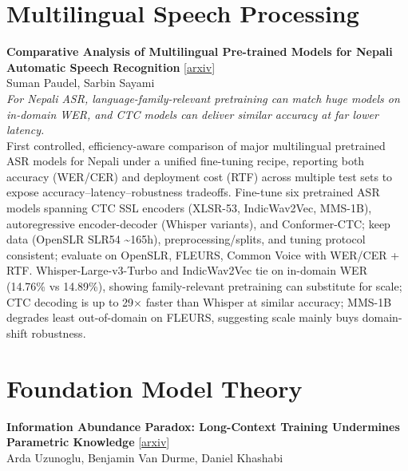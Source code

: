\documentclass[12pt,letterpaper]{article}
\begin{document}
\medskip


\section*{Multilingual Speech Processing}

{\small\textbf{Comparative Analysis of Multilingual Pre-trained Models for Nepali Automatic Speech Recognition}} {\scriptsize[\href{https://arxiv.org/abs/2608.12327}{arxiv}]}\\
{\scriptsize Suman Paudel, Sarbin Sayami}\\

{\small\textit{For Nepali ASR, language-family-relevant pretraining can match huge models on in-domain WER, and CTC models can deliver similar accuracy at far lower latency.}}\\[1pt]
{\footnotesize First controlled, efficiency-aware comparison of major multilingual pretrained ASR models for Nepali under a unified fine-tuning recipe, reporting both accuracy (WER/CER) and deployment cost (RTF) across multiple test sets to expose accuracy--latency--robustness tradeoffs. Fine-tune six pretrained ASR models spanning CTC SSL encoders (XLSR-53, IndicWav2Vec, MMS-1B), autoregressive encoder-decoder (Whisper variants), and Conformer-CTC; keep data (OpenSLR SLR54 \textasciitilde{}165h), preprocessing/splits, and tuning protocol consistent; evaluate on OpenSLR, FLEURS, Common Voice with WER/CER + RTF. Whisper-Large-v3-Turbo and IndicWav2Vec tie on in-domain WER (14.76\% vs 14.89\%), showing family-relevant pretraining can substitute for scale; CTC decoding is up to 29× faster than Whisper at similar accuracy; MMS-1B degrades least out-of-domain on FLEURS, suggesting scale mainly buys domain-shift robustness.}

\medskip


\section*{Foundation Model Theory}

{\small\textbf{Information Abundance Paradox: Long-Context Training Undermines Parametric Knowledge}} {\scriptsize[\href{https://arxiv.org/abs/2608.12218}{arxiv}]}\\
{\scriptsize Arda Uzunoglu, Benjamin Van Durme, Daniel Khashabi}\\
\end{document}
